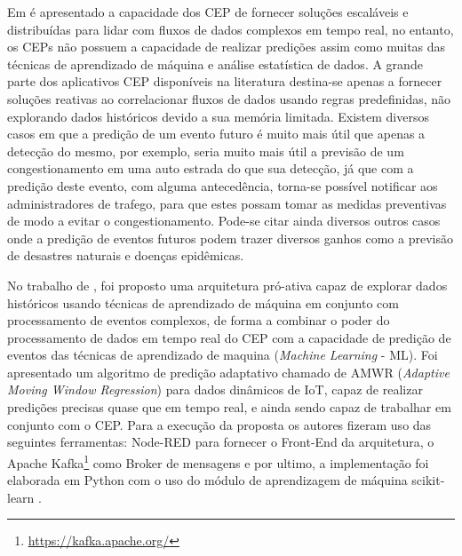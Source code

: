 \documentclass[ti,table]{texufpel} %
\begin{document}
	Em \cite{art4akbar2017predictive} é apresentado a capacidade dos CEP de fornecer soluções escaláveis e distribuídas para lidar com fluxos de dados complexos em tempo real, no entanto, os CEPs  não possuem a capacidade de realizar predições assim como muitas das técnicas de aprendizado de máquina e análise estatística de dados. A grande parte dos aplicativos CEP disponíveis  na literatura destina-se apenas a fornecer soluções reativas ao correlacionar fluxos de dados usando regras predefinidas, não explorando dados históricos devido a sua memória limitada. Existem diversos casos em que a predição de um evento futuro é muito mais útil que apenas a detecção do mesmo, por exemplo, seria muito mais útil a previsão de um congestionamento em uma auto estrada do que sua detecção, já que com a predição deste evento, com alguma antecedência, torna-se possível notificar aos administradores de trafego, para que estes possam tomar as medidas preventivas de modo a evitar o congestionamento. Pode-se citar ainda diversos outros casos onde a predição de eventos futuros podem trazer diversos ganhos como a previsão de desastres naturais e doenças epidêmicas. 
	
     No trabalho de \cite{art4akbar2017predictive}, foi proposto uma arquitetura pró-ativa capaz de explorar dados históricos usando técnicas de aprendizado de máquina em conjunto com processamento de eventos complexos, de forma a combinar o poder do processamento de dados em tempo real do CEP com a capacidade de predição de eventos das técnicas de aprendizado de maquina (\textit{Machine Learning} - ML). Foi apresentado um algoritmo de predição adaptativo chamado de AMWR (\textit{Adaptive Moving Window Regression}) para dados dinâmicos de IoT, capaz de realizar predições precisas quase que em tempo real, e ainda sendo capaz de trabalhar em conjunto com o CEP. Para a execução da proposta os autores fizeram uso das seguintes ferramentas: Node-RED para fornecer o Front-End da arquitetura, o Apache Kafka\footnote{\url{https://kafka.apache.org/}} como Broker de mensagens e por ultimo, a implementação foi elaborada em Python com o uso do módulo de aprendizagem de máquina scikit-learn .  
     
\end{document}
